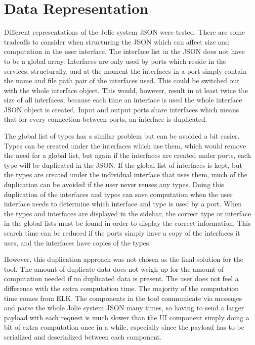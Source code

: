 \section{Data Representation}
Different representations of the Jolie system JSON were tested. There are some tradeoffs to consider when structuring the JSON which can affect size and computation in the user interface.
The interface list in the JSON does not have to be a global array. Interfaces are only used by ports which reside in the services, structurally, and at the moment the interfaces in a port simply contain the name and file path pair of the interfaces used. This could be switched out with the whole interface object.
This would, however, result in at least twice the size of all interfaces, because each time an interface is used the whole interface JSON object is created. Input and output ports share interfaces which means that for every connection between ports, an interface is duplicated.

The global list of types has a similar problem but can be avoided a bit easier. Types can be created under the interfaces which use them, which would remove the need for a global list, but again if the interfaces are created under ports, each type will be duplicated in the JSON. 
If the global list of interfaces is kept, but the types are created under the individual interface that uses them, much of the duplication can be avoided if the user never reuses any types. Doing this duplication of the interfaces and types can save computation when the user interface needs to determine which interface and type is used by a port. 
When the types and interfaces are displayed in the sidebar, the correct type or interface in the global lists must be found in order to display the correct information. This search time can be reduced if the ports simply have a copy of the interfaces it uses, and the interfaces have copies of the types.

However, this duplication approach was not chosen as the final solution for the tool.
The amount of duplicate data does not weigh up for the amount of computation needed if no duplicated data is present.
The user does not feel a difference with the extra computation time. The majority of the computation time comes from ELK.
The components in the tool communicate via messages and parse the whole Jolie system JSON many times, so having to send a larger payload with each request is much slower than the UI component simply doing a bit of extra computation once in a while, especially since the payload has to be serialized and deserialized between each component.


